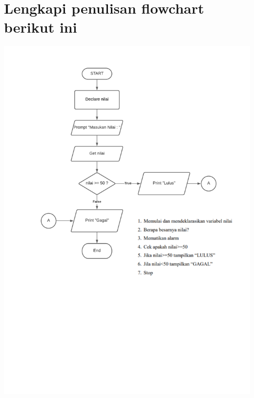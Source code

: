 \documentclass[
  12pt,
  answers  
]{exam}
\begin{document}
	\section{Lengkapi penulisan flowchart berikut ini}
	\includegraphics[clip, scale=0.9, trim={3cm 0 0 0}]{pdf/ProfunKelompok-1.pdf}
\end{document}
